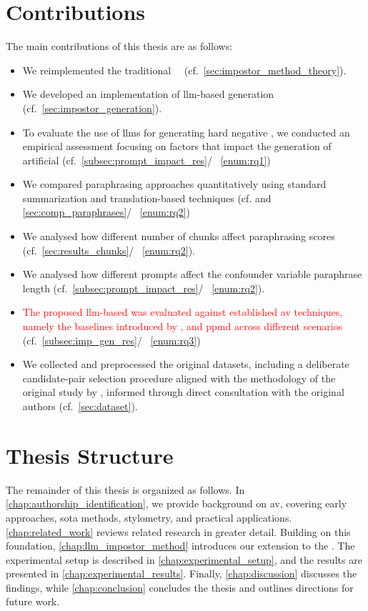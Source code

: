


\section{Contributions}
\label{sec:contributions}
The main contributions of this thesis are as follows:
\begin{itemize}
    \item We reimplemented the traditional \impAppr{}~\citep{koppel_determining_2014}\ (cf.~\autoref{sec:impostor_method_theory}).
    \item We developed an implementation of \ac{llm}-based \imp{} generation (cf.~\autoref{sec:impostor_generation}). 
    \item To evaluate the use of \acp{llm} for generating hard negative \imps{}, we conducted an empirical assessment focusing on factors that impact the generation of artificial \imps{} (cf.~\autoref{subsec:prompt_impact_res}/ ~\ref{enum:rq1})
    \item We compared paraphrasing approaches quantitatively using standard summarization and translation-based techniques (cf. and \autoref{sec:comp_paraphrases}/ ~\ref{enum:rq2})
    \item We analysed how different number of chunks affect paraphrasing scores (cf.~\autoref{sec:results_chunks}/ ~\ref{enum:rq2}).
    \item We analysed how different prompts affect the confounder variable paraphrase length (cf.~\autoref{subsec:prompt_impact_res}/ ~\ref{enum:rq2}).
    \item \textcolor{red}{The proposed \ac{llm}-based \impAppr{} was evaluated against established \ac{av} techniques, namely the baselines introduced by \citet{koppel_determining_2014}, \unmasking{} and \ac{ppmd} across different scenarios} (cf.~\autoref{subsec:imp_gen_res}/ ~\ref{enum:rq3})
    \item We collected and preprocessed the original datasets, including a deliberate candidate-pair selection procedure aligned with the methodology of the original study by \citet{koppel_determining_2014}, informed through direct consultation with the original authors (cf.~\autoref{sec:dataset}).
\end{itemize}



\section{Thesis Structure}
\label{sec:thesis_structure}
The remainder of this thesis is organized as follows. 
In \autoref{chap:authorship_identification}, we provide background on \acf{av}, covering early approaches, \acl{sota} methods, stylometry, and practical applications. 
\autoref{chap:related_work} reviews related research in greater detail. 
Building on this foundation, \autoref{chap:llm_impostor_method} introduces our extension to the \impAppr{}. 
The experimental setup is described in \autoref{chap:experimental_setup}, and the results are presented in \autoref{chap:experimental_results}. 
Finally, \autoref{chap:discussion} discusses the findings, while \autoref{chap:conclusion} concludes the thesis and outlines directions for future work.
